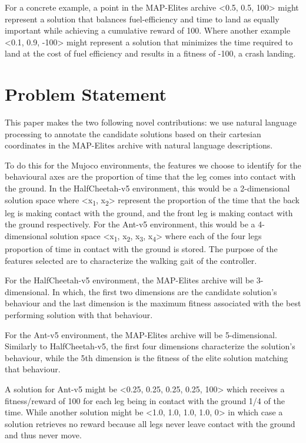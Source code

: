 \documentclass[11pt]{article}
\begin{document}
For a concrete example, a point in the MAP-Elites
archive <0.5, 0.5, 100> might represent a solution that balances fuel-efficiency and time to land as equally important
while achieving a cumulative reward of 100. Where another example <0.1, 0.9, -100> might represent
a solution that minimizes the time required to land at the cost of fuel efficiency and results in a fitness of -100, a crash landing.

\section{Problem Statement}
\label{sec:orgc14bcce}

This paper makes the two following novel contributions: we use natural language processing
to annotate the candidate solutions based on their cartesian coordinates in the MAP-Elites archive
with natural language descriptions.

To do this for the Mujoco environments, the features we choose to identify for the behavioural
axes are the proportion of time that the leg comes into contact with the ground. In the HalfCheetah-v5 environment,
this would be a 2-dimensional solution space where <x\textsubscript{1}, x\textsubscript{2}> represent the proportion of the time
that the back leg is making contact with the ground, and the front leg is making contact with the ground
respectively. For the Ant-v5 environment, this would be a 4-dimensional solution space <x\textsubscript{1}, x\textsubscript{2}, x\textsubscript{3}, x\textsubscript{4}>
where each of the four legs proportion of time in contact with the ground is stored.
The purpose of the features selected are to characterize the walking gait of the controller.

For the HalfCheetah-v5 environment, the MAP-Elites archive will be 3-dimensional.
In which, the first two dimensions are the candidate solution's behaviour and the last dimension
is the maximum fitness associated with the best performing solution with that behaviour.

For the Ant-v5 environment, the MAP-Elites archive will be 5-dimensional. Similarly to HalfCheetah-v5,
the first four dimensions characterize the solution's behaviour, while the 5th dimension is the fitness
of the elite solution matching that behaviour.

A solution for Ant-v5 might be <0.25, 0.25, 0.25, 0.25, 100> which receives a fitness/reward of 100
for each leg being in contact with the ground 1/4 of the time. While another solution might be
<1.0, 1.0, 1.0, 1.0, 0> in which case a solution retrieves no reward because all legs never
leave contact with the ground and thus never move.
\end{document}
